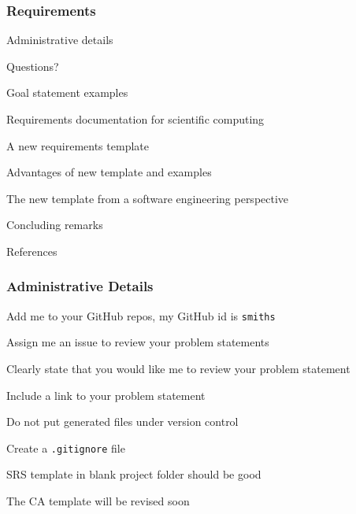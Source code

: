 \documentclass[t,12pt,numbers,fleqn]{beamer}
\begin{document}



\begin{frame}
\frametitle{Requirements}

\bi
\item Administrative details
\item Questions?
\item Goal statement examples
\item Requirements documentation for scientific computing
\item A new requirements template
\item Advantages of new template and examples
\item The new template from a software engineering perspective
\item Concluding remarks
\item References
\ei
\end{frame}


\begin{frame}
\frametitle{Administrative Details}

\bi
\item Add me to your GitHub repos, my GitHub id is \texttt{smiths}
\item Assign me an issue to review your problem statements
\bi
\item Clearly state that you would like me to review your problem statement
\item Include a link to your problem statement
\ei
\item Do not put generated files under version control
\item Create a \texttt{.gitignore} file
\item SRS template in blank project folder should be good
\item The CA template will be revised soon
\ei

\end{frame}

\end{document}
